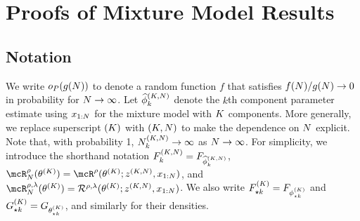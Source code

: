 \section{Proofs of Mixture Model Results} \label{sec:mixture-model-consistency}
\subsection{Notation}
We write $o_{P}(g(N))$ to denote a random function $f$ that satisfies $f(N) / g(N) \to 0$ in probability for $N \to \infty$.
Let $\widehat{\phi}_{k}^{(K,N)}$ denote the $k$th component parameter estimate using $x_{1:N}$
for the mixture model with $K$ components.
More generally, we replace superscript $(K)$ with $(K,N)$ to make the dependence on $N$ explicit.
Note that, with probability 1, $N^{(K,N)}_k \rightarrow \infty$ as $N \rightarrow \infty$.
For simplicity, we introduce the shorthand notation
$F^{(K,N)}_{k} = F_{\widehat{\phi}^{(K,N)}_k}$,
$\mcR^{\rho}_{\numobs} (\allparam^{(\numcomps)}) = \mcR^{\rho}(\allparam^{(\numcomps)}; z^{(\numcomps,\numobs)}, \data{1:\numobs})$, and
$\mcR^{\rho,\lambda}_{\numobs}(\allparam^{(\numcomps)}) = \mathcal{R}^{\rho,\lambda}(\allparam^{(\numcomps)}; z^{(\numcomps,\numobs)}, \data{1:\numobs})$.
We also write $F^{(K)}_{\star k} = F_{\phi^{(K)}_{\star k}}$ and $G^{(K)}_{\star k} = G_{\theta^{(K)}_{\star k}}$, and similarly for their densities.

